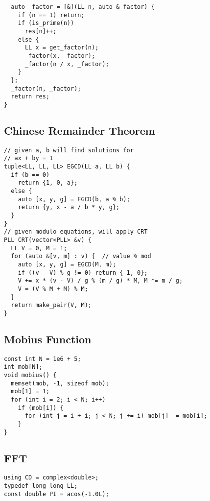 \documentclass[FSZ,a4paper,onesided]{article}
\begin{document}
\begin{multicols*}{\COLS}
\begin{lstlisting}
  auto _factor = [&](LL n, auto &_factor) {
    if (n == 1) return;
    if (is_prime(n))
      res[n]++;
    else {
      LL x = get_factor(n);
      _factor(x, _factor);
      _factor(n / x, _factor);
    }
  };
  _factor(n, _factor);
  return res;
}
\end{lstlisting}
\subsection{Chinese Remainder Theorem}
\begin{lstlisting}
// given a, b will find solutions for
// ax + by = 1
tuple<LL, LL, LL> EGCD(LL a, LL b) {
  if (b == 0)
    return {1, 0, a};
  else {
    auto [x, y, g] = EGCD(b, a % b);
    return {y, x - a / b * y, g};
  }
}
// given modulo equations, will apply CRT
PLL CRT(vector<PLL> &v) {
  LL V = 0, M = 1;
  for (auto &[v, m] : v) {  // value % mod
    auto [x, y, g] = EGCD(M, m);
    if ((v - V) % g != 0) return {-1, 0};
    V += x * (v - V) / g % (m / g) * M, M *= m / g;
    V = (V % M + M) % M;
  }
  return make_pair(V, M);
}
\end{lstlisting}
\subsection{Mobius Function}
\begin{lstlisting}
const int N = 1e6 + 5;
int mob[N];
void mobius() {
  memset(mob, -1, sizeof mob);
  mob[1] = 1;
  for (int i = 2; i < N; i++)
    if (mob[i]) {
      for (int j = i + i; j < N; j += i) mob[j] -= mob[i];
    }
}

\end{lstlisting}
\subsection{FFT}
\begin{lstlisting}
using CD = complex<double>;
typedef long long LL;
const double PI = acos(-1.0L);


\end{lstlisting}
\end{multicols*}
\end{document}
